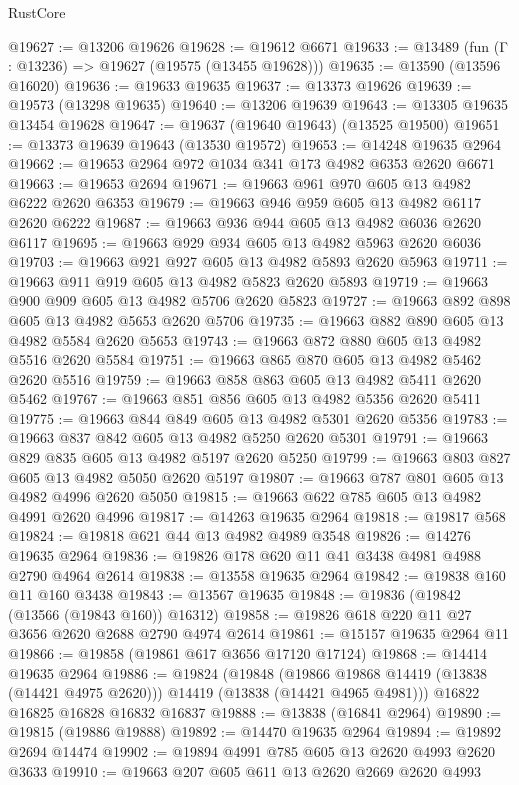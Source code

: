 \begin{lexlean}{RustCore}
\begin{coremodule}
@19627 := @13206 @19626
@19628 := @19612 @6671
@19633 := @13489 (fun (Γ : @13236) => @19627 (@19575 (@13455 @19628)))
@19635 := @13590 (@13596 @16020)
@19636 := @19633 @19635
@19637 := @13373 @19626
@19639 := @19573 (@13298 @19635)
@19640 := @13206 @19639
@19643 := @13305 @19635 @13454 @19628
@19647 := @19637 (@19640 @19643) (@13525 @19500)
@19651 := @13373 @19639 @19643 (@13530 @19572)
@19653 := @14248 @19635 @2964
@19662 := @19653 @2964 @972 @1034 @341 @173 @4982 @6353 @2620 @6671
@19663 := @19653 @2694
@19671 := @19663 @961 @970 @605 @13 @4982 @6222 @2620 @6353
@19679 := @19663 @946 @959 @605 @13 @4982 @6117 @2620 @6222
@19687 := @19663 @936 @944 @605 @13 @4982 @6036 @2620 @6117
@19695 := @19663 @929 @934 @605 @13 @4982 @5963 @2620 @6036
@19703 := @19663 @921 @927 @605 @13 @4982 @5893 @2620 @5963
@19711 := @19663 @911 @919 @605 @13 @4982 @5823 @2620 @5893
@19719 := @19663 @900 @909 @605 @13 @4982 @5706 @2620 @5823
@19727 := @19663 @892 @898 @605 @13 @4982 @5653 @2620 @5706
@19735 := @19663 @882 @890 @605 @13 @4982 @5584 @2620 @5653
@19743 := @19663 @872 @880 @605 @13 @4982 @5516 @2620 @5584
@19751 := @19663 @865 @870 @605 @13 @4982 @5462 @2620 @5516
@19759 := @19663 @858 @863 @605 @13 @4982 @5411 @2620 @5462
@19767 := @19663 @851 @856 @605 @13 @4982 @5356 @2620 @5411
@19775 := @19663 @844 @849 @605 @13 @4982 @5301 @2620 @5356
@19783 := @19663 @837 @842 @605 @13 @4982 @5250 @2620 @5301
@19791 := @19663 @829 @835 @605 @13 @4982 @5197 @2620 @5250
@19799 := @19663 @803 @827 @605 @13 @4982 @5050 @2620 @5197
@19807 := @19663 @787 @801 @605 @13 @4982 @4996 @2620 @5050
@19815 := @19663 @622 @785 @605 @13 @4982 @4991 @2620 @4996
@19817 := @14263 @19635 @2964
@19818 := @19817 @568
@19824 := @19818 @621 @44 @13 @4982 @4989 @3548
@19826 := @14276 @19635 @2964
@19836 := @19826 @178 @620 @11 @41 @3438 @4981 @4988 @2790 @4964 @2614
@19838 := @13558 @19635 @2964
@19842 := @19838 @160 @11 @160 @3438
@19843 := @13567 @19635
@19848 := @19836 (@19842 (@13566 (@19843 @160)) @16312)
@19858 := @19826 @618 @220 @11 @27 @3656 @2620 @2688 @2790 @4974 @2614
@19861 := @15157 @19635 @2964 @11
@19866 := @19858 (@19861 @617 @3656 @17120 @17124)
@19868 := @14414 @19635 @2964
@19886 := @19824
    (@19848
      (@19866 @19868 @14419 (@13838 (@14421 @4975 @2620)))
      @14419
      (@13838 (@14421 @4965 @4981)))
    @16822
    @16825
    @16828
    @16832
    @16837
@19888 := @13838 (@16841 @2964)
@19890 := @19815 (@19886 @19888)
@19892 := @14470 @19635 @2964
@19894 := @19892 @2694 @14474
@19902 := @19894 @4991 @785 @605 @13 @2620 @4993 @2620 @3633
@19910 := @19663 @207 @605 @611 @13 @2620 @2669 @2620 @4993

\end{coremodule}
\end{lexlean}
